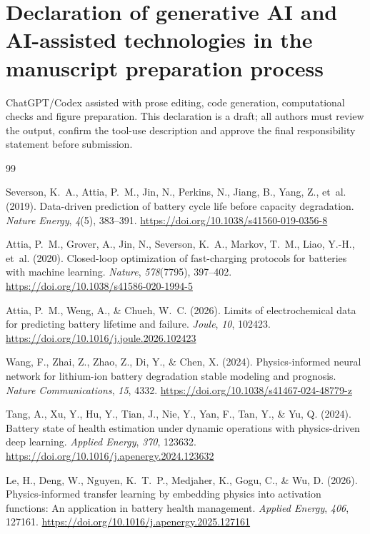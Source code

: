 \documentclass[preprint,12pt]{elsarticle}
\begin{document}
\section*{Declaration of generative AI and AI-assisted technologies in the manuscript preparation process}
ChatGPT/Codex assisted with prose editing, code generation, computational checks and figure preparation. This declaration is a draft; all authors must review the output, confirm the tool-use description and approve the final responsibility statement before submission.
\begin{thebibliography}{99}

Severson, K.~A., Attia, P.~M., Jin, N., Perkins, N., Jiang, B., Yang, Z., et~al. (2019). Data-driven prediction of battery cycle life before capacity degradation. \textit{Nature Energy}, \textit{4}(5), 383--391. \url{https://doi.org/10.1038/s41560-019-0356-8}

Attia, P.~M., Grover, A., Jin, N., Severson, K.~A., Markov, T.~M., Liao, Y.-H., et~al. (2020). Closed-loop optimization of fast-charging protocols for batteries with machine learning. \textit{Nature}, \textit{578}(7795), 397--402. \url{https://doi.org/10.1038/s41586-020-1994-5}

Attia, P.~M., Weng, A., \& Chueh, W.~C. (2026). Limits of electrochemical data for predicting battery lifetime and failure. \textit{Joule}, \textit{10}, 102423. \url{https://doi.org/10.1016/j.joule.2026.102423}

Wang, F., Zhai, Z., Zhao, Z., Di, Y., \& Chen, X. (2024). Physics-informed neural network for lithium-ion battery degradation stable modeling and prognosis. \textit{Nature Communications}, \textit{15}, 4332. \url{https://doi.org/10.1038/s41467-024-48779-z}

Tang, A., Xu, Y., Hu, Y., Tian, J., Nie, Y., Yan, F., Tan, Y., \& Yu, Q. (2024). Battery state of health estimation under dynamic operations with physics-driven deep learning. \textit{Applied Energy}, \textit{370}, 123632. \url{https://doi.org/10.1016/j.apenergy.2024.123632}

Le, H., Deng, W., Nguyen, K.~T.~P., Medjaher, K., Gogu, C., \& Wu, D. (2026). Physics-informed transfer learning by embedding physics into activation functions: An application in battery health management. \textit{Applied Energy}, \textit{406}, 127161. \url{https://doi.org/10.1016/j.apenergy.2025.127161}


\end{thebibliography}
\end{document}
